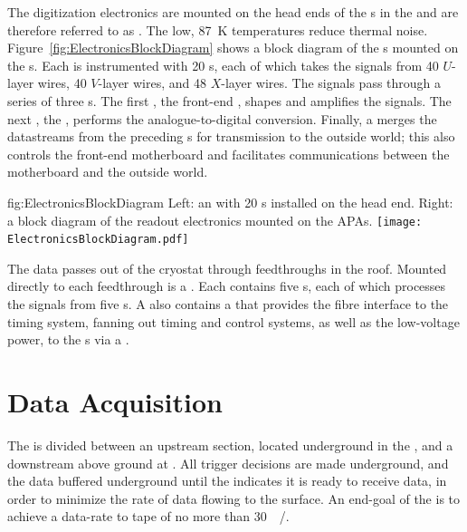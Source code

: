 The digitization electronics are mounted on the head ends of the s in the  and are therefore referred to as . The low, \SI{87}{\kelvin} temperatures reduce thermal noise. Figure~\ref{fig:ElectronicsBlockDiagram} shows a block diagram of the s mounted on the s. Each  is instrumented with 20 s, each of which takes the signals from 40 $U$-layer wires, 40 $V$-layer wires, and 48 $X$-layer wires. The signals pass through a series of three s. The first , the front-end , shapes and amplifies the signals. The next , the  , performs the analogue-to-digital conversion. Finally, a   merges the datastreams from the preceding s for transmission to the outside world; this   also controls the front-end motherboard and facilitates communications between the motherboard and the outside world.

\begin{dunefigure}{fig:ElectronicsBlockDiagram}
{Left: an  with 20 s installed on the head end. Right: a block diagram of the readout electronics mounted on the APAs.}
\texttt{[image: ElectronicsBlockDiagram.pdf]}
\end{dunefigure}

The data passes out of the cryostat through feedthroughs in the roof. Mounted directly to each feedthrough is a . Each  contains five s, each of which processes the signals from five s. A  also contains a  that provides the fibre interface to the timing system, fanning out timing and control systems, as well as the low-voltage power, to the s via a .

\section{Data Acquisition}
\label{sec:fdsp-exec-daq}


The  is divided between an upstream section, located underground in the , and a downstream  above ground at . All trigger decisions are made underground, and the data buffered underground until the  indicates it is ready to receive data, in order to minimize the rate of data flowing to the surface. An end-goal of the  is to achieve a data-rate to tape of no more than \SI{30}{\peta\byte/\year}.

